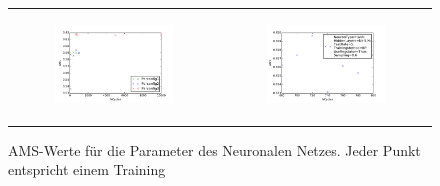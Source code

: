 \begin{figure}[!t]
  \begin{tabular}[b]{cc}
	  \begin{subfigure}[b]{0.5\linewidth}
	   	\includegraphics[width=\linewidth]{sections/parameter_optimization_ANN/plot5.pdf}
 		\caption[]{}
		\label{fig:NN_VariationofLayers}
  	  \end{subfigure} &
  	  \begin{subfigure}[b]{0.5\linewidth}
  	  	\includegraphics[width=\linewidth]{sections/parameter_optimization_ANN/plot4.pdf}
 		\caption[]{}
		\label{fig:NN_VariationofCycles}
  	  \end{subfigure}
  \end{tabular}
  \caption[]{AMS-Werte für die Parameter des Neuronalen Netzes. Jeder Punkt entspricht einem Training}
  \label{fig:AMS-distribution-plots}
\end{figure}



